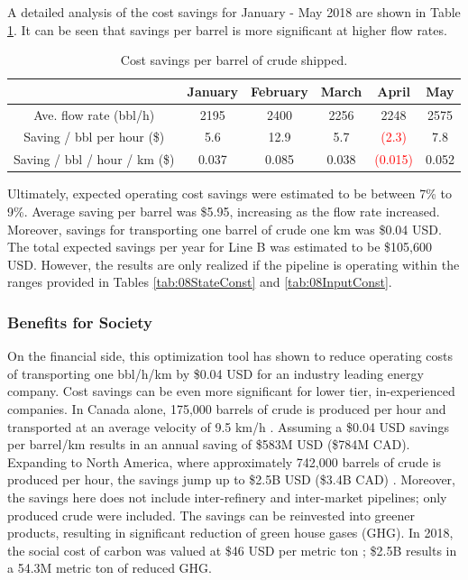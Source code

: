 A detailed analysis of the cost savings for January - May 2018 are shown in Table \ref{tab:08Cost_per_barrel}. It can be seen that savings per barrel is more significant at higher flow rates.  

\begin{table}[h]
    \centering
    {
    \begin{tabular}{c|c|c|c|c|c}
                       & January & February & March & April & May  \\ \hline
        Ave. flow rate (bbl/h) & 2195    & 2400     & 2256  & 2248  & 2575 \\
        Saving / bbl per hour (\$)      & 5.6     & 12.9     & 5.7   & \textcolor{red}{(2.3)} & 7.8\\
        Saving / bbl / hour / km (\$) & 0.037 & 0.085 & 0.038 & \textcolor{red}{(0.015)} & 0.052 \\
    \end{tabular}}
    \caption{Cost savings per barrel of crude shipped.}
    \label{tab:08Cost_per_barrel}
\end{table}

Ultimately, expected operating cost savings were estimated to be between 7\% to 9\%.  Average saving per barrel was \$5.95, increasing as the flow rate increased. Moreover, savings for transporting one barrel of crude one km was \$0.04 USD.  The total expected savings per year for Line B was estimated to be \$105,600 USD.  However, the results are only realized if the pipeline is operating within the ranges provided in Tables \ref{tab:08StateConst} and \ref{tab:08InputConst}.

\subsubsection{Benefits for Society}
On the financial side, this optimization tool has shown to reduce operating costs of transporting one bbl/h/km by \$0.04 USD for an industry leading energy company. Cost savings can be even more significant for lower tier, in-experienced companies. In Canada alone, 175,000 barrels of crude is produced per hour and transported at an average velocity of 9.5 km/h \cite{canada_crude_facts}.  Assuming a \$0.04 USD savings per barrel/km results in an annual saving of \$583M USD (\$784M CAD).  Expanding to North America, where approximately 742,000 barrels of crude is produced per hour, the savings jump up to \$2.5B USD (\$3.4B CAD) \cite{NA_crude_facts}. Moreover, the savings here does not include inter-refinery and inter-market pipelines; only produced crude were included.  The savings can be reinvested into greener products, resulting in significant reduction of green house gases (GHG). In 2018, the social cost of carbon was valued at \$46 USD per metric ton \cite{cost_of_carbon}; \$2.5B results in a 54.3M metric ton of reduced GHG.

